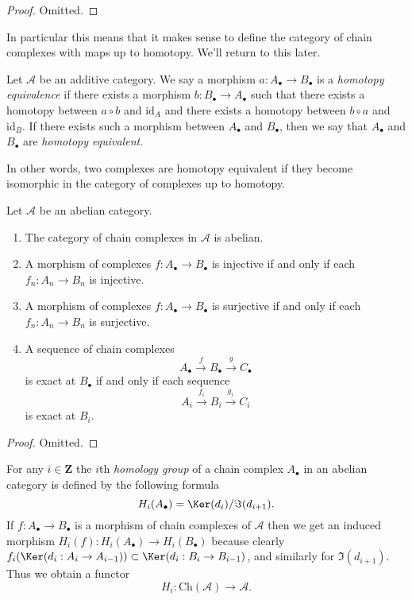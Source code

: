 \begin{proof}
Omitted.
\end{proof}

\noindent
In particular this means that it makes sense to define
the category of chain complexes with maps up to homotopy.
We'll return to this later.

\begin{definition}
\label{definition-homotopy-equivalent}
Let $\mathcal{A}$ be an additive category.
We say a morphism $a : A_\bullet \to B_\bullet$
is a {\it homotopy equivalence} if there exists
a morphism $b : B_\bullet \to A_\bullet$
such that there exists a homotopy between
$a \circ b$ and $\text{id}_A$
and there exists a homotopy between $b \circ a$ and $\text{id}_B$.
If there exists such a morphism between $A_\bullet$ and $B_\bullet$, then
we say that $A_\bullet$ and $B_\bullet$ are {\it homotopy equivalent}.
\end{definition}

\noindent
In other words, two complexes are homotopy equivalent if they become
isomorphic in the category of complexes up to homotopy.

\begin{lemma}
\label{lemma-cat-chain-abelian}
Let $\mathcal{A}$ be an abelian category.
\begin{enumerate}
\item The category of chain complexes in $\mathcal{A}$ is
abelian.
\item A morphism of complexes
$f : A_\bullet \to B_\bullet$ is injective
if and only if each $f_n : A_n \to B_n$ is injective.
\item A morphism of complexes
$f : A_\bullet \to B_\bullet$ is surjective
if and only if each $f_n : A_n \to B_n$ is surjective.
\item A sequence of chain complexes
$$
A_\bullet \xrightarrow{f} B_\bullet \xrightarrow{g} C_\bullet
$$
is exact at $B_\bullet$ if and only if each sequence
$$
A_i \xrightarrow{f_i} B_i \xrightarrow{g_i} C_i
$$
is exact at $B_i$.
\end{enumerate}
\end{lemma}

\begin{proof}
Omitted.
\end{proof}

\noindent
For any $i \in \mathbf{Z}$ the $i$th {\it homology group}
of a chain complex $A_\bullet$ in an abelian category is defined by
the following formula
$$
H_i(A_\bullet) = \Ker(d_i)/\Im(d_{i + 1}).
$$
If $f : A_\bullet \to B_\bullet$ is a morphism of chain
complexes of $\mathcal{A}$ then we get an induced
morphism $H_i(f) : H_i(A_\bullet) \to H_i(B_\bullet)$
because clearly
$f_i(\Ker(d_i : A_i \to A_{i - 1})) \subset
\Ker(d_i : B_i \to B_{i - 1})$, and similarly
for $\Im(d_{i + 1})$.
Thus we obtain a functor
$$
H_i : \text{Ch}(\mathcal{A}) \longrightarrow \mathcal{A}.
$$

